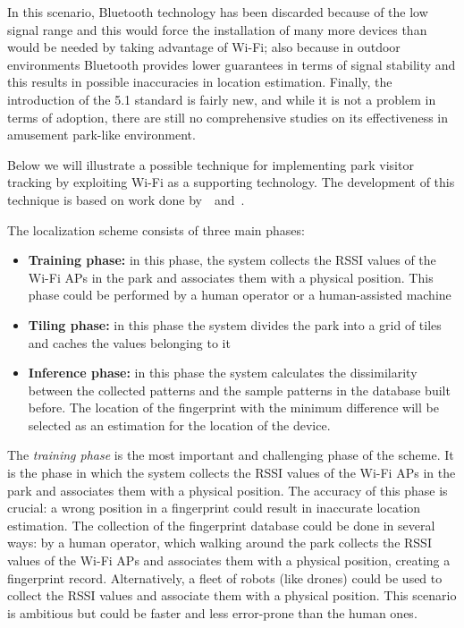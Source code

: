 In this scenario, Bluetooth technology has been discarded because of the low signal range and this would force the installation of many more devices
than would be needed by taking advantage of Wi-Fi; also because in outdoor environments Bluetooth provides lower guarantees in terms of signal
stability and this results in possible inaccuracies in location estimation. Finally, the introduction of the 5.1 standard is fairly new, and while it
is not a problem in terms of adoption, there are still no comprehensive studies on its effectiveness in amusement park-like environment.

Below we will illustrate a possible technique for implementing park visitor tracking by exploiting Wi-Fi as a supporting technology. The development
of this technique is based on work done by~\cite{du2018hybrid}~and~\cite{chaudhry2013indoor}.

The localization scheme consists of three main phases:

\begin{itemize}
	\item \textbf{Training phase:} in this phase, the system collects the RSSI values of the Wi-Fi APs in the park and associates them with a
	      physical position. This phase could be performed by a human operator or a human-assisted machine
	\item \textbf{Tiling phase:} in this phase the system divides the park into a grid of tiles and caches the values belonging to it
	\item \textbf{Inference phase:} in this phase the system calculates the dissimilarity between the collected patterns and the sample
	      patterns in the database built before. The location of the fingerprint with the minimum difference will be selected as an estimation for the
	      location of the device.
\end{itemize}

The \textit{training phase} is the most important and challenging phase of the scheme. It is the phase in which the system collects the RSSI values
of the Wi-Fi APs in the park and associates them with a physical position. The accuracy of this phase is crucial: a wrong position in a fingerprint
could result in inaccurate location estimation. The collection of the fingerprint database could be done in several ways: by a human operator, which
walking around the park collects the RSSI values of the Wi-Fi APs and associates them with a physical position, creating a fingerprint record.
Alternatively, a fleet of robots (like drones) could be used to collect the RSSI values and associate them with a physical position. This scenario is
ambitious but could be faster and less error-prone than the human ones.

